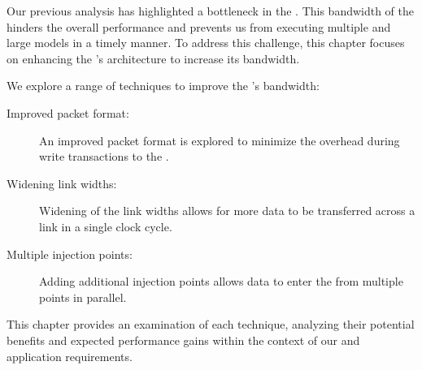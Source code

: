 Our previous analysis has highlighted a bottleneck in the \confignoc{}.
This bandwidth of the \confignoc{} hinders the overall performance and prevents us from executing multiple and large models in a timely manner.
To address this challenge, this chapter focuses on enhancing the \confignoc{}'s architecture to increase its bandwidth.

We explore a range of techniques to improve the \confignoc{}'s bandwidth:
\begin{description}
    \item[Improved packet format:]
    An improved packet format is explored to minimize the overhead during write transactions to the \graicore{}.
    \item[Widening link widths:]
    Widening of the link widths allows for more data to be transferred across a link in a single clock cycle.
    \item[Multiple injection points:]
    Adding additional injection points allows data to enter the \confignoc{} from multiple points in parallel.
\end{description}

This chapter provides an examination of each technique, analyzing their potential benefits and expected performance gains within the context of our \confignoc{} and application requirements.
